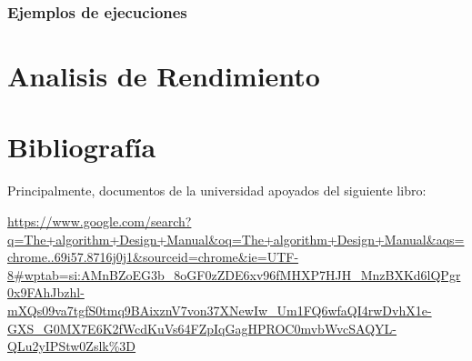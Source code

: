 \documentclass[a4paper, 12.5pt]{report}
\begin{document}
\subsubsection{Ejemplos de ejecuciones}



\section{Analisis de Rendimiento}

\section{Bibliografía}

Principalmente, documentos de la universidad apoyados del siguiente libro:

\url{https://www.google.com/search?q=The+algorithm+Design+Manual&oq=The+algorithm+Design+Manual&aqs=chrome..69i57.8716j0j1&sourceid=chrome&ie=UTF-8#wptab=si:AMnBZoEG3b_8oGF0zZDE6xv96fMHXP7HJH_MnzBXKd6lQPgr0x9FAhJbzhl-mXQs09va7tgfS0tmq9BAixznV7von37XNewIw_Um1FQ6wfaQI4rwDvhX1e-GXS_G0MX7E6K2fWcdKuVs64FZpIqGagHPROC0mvbWvcSAQYL-QLu2yIPStw0Zslk%3D}
\end{document}
